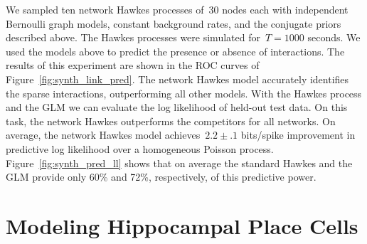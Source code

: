 We sampled ten network Hawkes processes of~$30$ nodes each with
independent Bernoulli graph models, constant background rates, and the
conjugate priors described above. The Hawkes
processes were simulated for~${T=1000}$ seconds. We used the models
above to predict the presence or absence of interactions. The results
of this experiment are shown in the ROC curves of
Figure~\ref{fig:synth_link_pred}. The network Hawkes model accurately
identifies the sparse interactions, outperforming all other models.
With the Hawkes process and the GLM we can evaluate the log likelihood
of held-out test data. On this task, the network Hawkes outperforms
the competitors for all networks. On average, the network Hawkes model
achieves~$2.2\pm.1$ bits/spike improvement in predictive log
likelihood over a homogeneous Poisson
process. Figure~\ref{fig:synth_pred_ll} shows that on average the
standard Hawkes and the GLM provide only 60\% and 72\%, respectively,
of this predictive power. 

\section{Modeling Hippocampal Place Cells}

